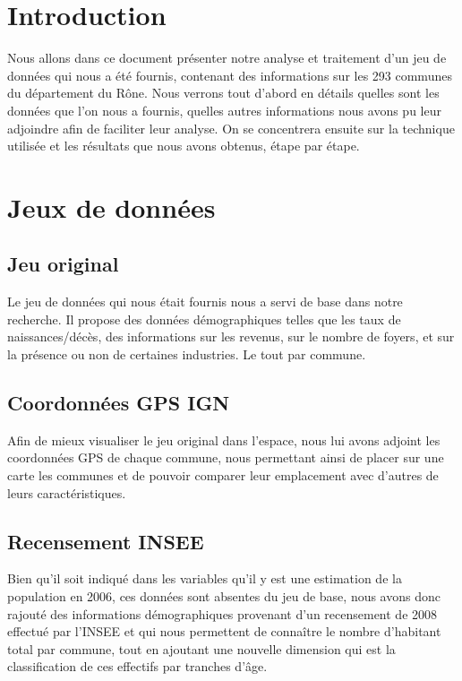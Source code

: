 \section{Introduction}

Nous allons dans ce document présenter notre analyse et traitement d'un jeu de données qui nous a été fournis, contenant des informations sur les 293 communes du département du Rône. Nous verrons tout d'abord en détails quelles sont les données que l'on nous a fournis, quelles autres informations nous avons pu leur adjoindre afin de faciliter leur analyse. On se concentrera ensuite sur la technique utilisée et les résultats que nous avons obtenus, étape par étape.

\section{Jeux de données}

\subsection{Jeu original}

Le jeu de données qui nous était fournis nous a servi de base dans notre recherche. Il propose des données démographiques telles que les taux de naissances/décès, des informations sur les revenus, sur le nombre de foyers, et sur la présence ou non de certaines industries. Le tout par commune.

\subsection{Coordonnées GPS IGN}

Afin de mieux visualiser le jeu original dans l'espace, nous lui avons adjoint les coordonnées GPS de chaque commune, nous permettant ainsi de placer sur une carte les communes et de pouvoir comparer leur emplacement avec d'autres de leurs caractéristiques.

\subsection{Recensement INSEE}
Bien qu'il soit indiqué dans les variables qu'il y est une estimation de la population en 2006, ces données sont absentes du jeu de base, nous avons donc rajouté des informations démographiques provenant d'un recensement de 2008 effectué par l'INSEE et qui nous permettent de connaître le nombre d'habitant total par commune, tout en ajoutant une nouvelle dimension qui est la classification de ces effectifs par tranches d'âge.

